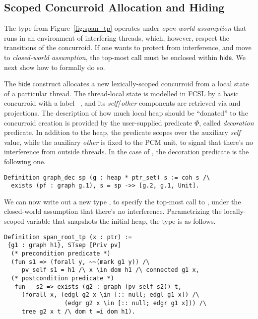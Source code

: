 \subsection{Scoped Concurroid Allocation and Hiding}

The  type from Figure~\ref{fig:span_tp} operates under
\emph{open-world assumption} that  runs in an environment
of interfering threads, which, however, respect the transitions of the
 concurroid. If one wants to protect  from
interference, and move to \emph{closed-world assumption}, the top-most
call must be enclosed within $\mathsf{hide}$. We next show how to
formally do so.

The $\mathsf{hide}$ construct allocates a new lexically-scoped
concurroid from a local state of a particular thread.  The
thread-local state is modelled in FCSL by a basic concurroid
 with a label
~\cite[\S4]{Nanevski-al:ESOP14}, and its
\emph{self}/\emph{other} components are retrieved via 
and  projections.
%
%
The description of how much local heap should be ``donated'' to the
concurroid creation is provided by the user-supplied predicate $\Phi$,
called \emph{decoration} predicate. In addition to the heap, the
predicate scopes over the auxiliary \emph{self} value, while the
auxiliary \emph{other} is fixed to the PCM unit, to signal that
there's no interference from outside threads. In the case of
, the decoration predicate is the following one.
%
\begin{lstlisting}
Definition graph_dec sp (g : heap * ptr_set) s := coh s /\
  exists (pf : graph g.1), s = sp ->> [g.2, g.1, Unit]. 
\end{lstlisting}
%
%
We can now write out a new type , to specify the
top-most call to \code{span}, under the closed-world assumption that
there's no interference. Parametrizing \wrt the locally-scoped
variable  that snapshots the initial heap, the type is
as follows.
%
\begin{lstlisting}
Definition span_root_tp (x : ptr) :=
 {g1 : graph h1}, STsep [Priv pv] 
  (* precondition predicate *)
  (fun s1 => (forall y, ~~(mark g1 y)) /\
     pv_self s1 = h1 /\ x \in dom h1 /\ connected g1 x, 
  (* postcondition predicate *)
   fun _ s2 => exists (g2 : graph (pv_self s2)) t, 
     (forall x, (edgl g2 x \in [:: null; edgl g1 x]) /\
                 (edgr g2 x \in [:: null; edgr g1 x])) /\
     tree g2 x t /\ dom t =i dom h1).
\end{lstlisting}
